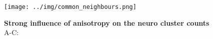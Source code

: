 \begin{figure}[h]
\texttt{[image: ../img/common\_neighbours.png]} %
\caption{{\bf Strong influence of anisotropy on the neuro cluster counts}
A-C:}
\label{fig_cluster}%
\end{figure}
